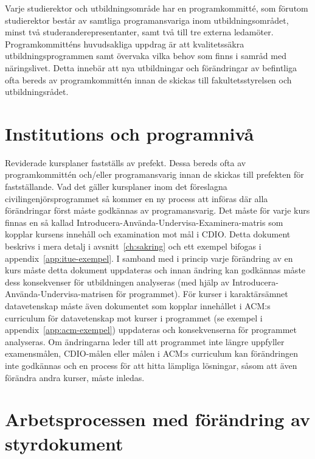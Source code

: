 Varje studierektor och utbildningsområde har en programkommitté, som förutom studierektor består av samtliga programansvariga inom utbildningsområdet, minst två studeranderepresentanter, samt två till tre externa ledamöter. Programkommitténs huvudsakliga uppdrag är att kvalitetssäkra utbildningsprogrammen samt övervaka vilka behov som finns i samråd med näringslivet. Detta innebär att nya utbildningar och förändringar av befintliga ofta bereds av programkommittén innan de skickas till fakultetsstyrelsen och utbildningsrådet.

\section{Institutions och programnivå}

Reviderade kursplaner fastställs av prefekt. Dessa bereds ofta av programkommittén och/eller programansvarig innan de skickas till prefekten för fastställande. Vad det gäller kursplaner inom det föreslagna civilingenjörsprogrammet så kommer en ny process att införas där alla förändringar först måste godkännas av programansvarig. Det måste för varje kurs finnas en så kallad Introducera-Använda-Undervisa-Examinera-matris som kopplar kursens innehåll och examination mot mål i CDIO. Detta dokument beskrivs i mera detalj i avsnitt~\ref{ch:sakring} och ett exempel bifogas i appendix~\ref{app:itue-exempel}. I samband med i princip varje förändring av en kurs måste detta dokument uppdateras och innan ändring kan godkännas måste dess konsekvenser för utbildningen analyseras (med hjälp av Introducera-Använda-Undervisa-matrisen för programmet). För kurser i karaktärsämnet datavetenskap måste även dokumentet som kopplar innehållet i ACM:s curriculum för datavetenskap mot kurser i programmet (se exempel i appendix~\ref{app:acm-exempel}) uppdateras och konsekvenserna för programmet analyseras. Om ändringarna leder till att programmet inte längre uppfyller examensmålen, CDIO-målen eller målen i ACM:s curriculum kan förändringen inte godkännas och en process för att hitta lämpliga lösningar, såsom att även förändra andra kurser, måste inledas.

\section{Arbetsprocessen med förändring av styrdokument}

